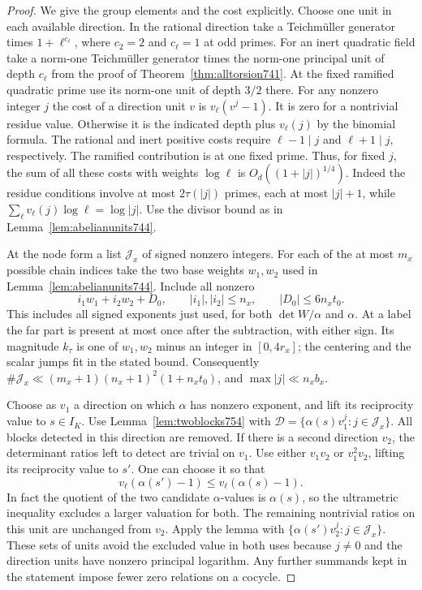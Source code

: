 \documentclass[a4paper,11pt]{article}
\theoremstyle{definition}
\theoremstyle{remark}
\numberwithin{equation}{section}
\begin{document}
\begin{proof}
We give the group elements and the cost explicitly. Choose
one unit in each available direction. In the rational direction
take a Teichm\"uller generator times \(1+\ell^{c_\ell}\),
where \(c_2=2\) and \(c_\ell=1\) at odd primes. For an inert
quadratic field take a norm-one Teichm\"uller generator times
the norm-one principal unit of depth \(c_\ell\) from the proof
of Theorem~\ref{thm:alltorsion741}. At the fixed ramified
quadratic prime use its norm-one unit of depth \(3/2\) there.
For any nonzero integer \(j\) the cost of a direction unit \(v\)
is \(v_\ell(v^j-1)\). It is zero for a nontrivial residue value.
Otherwise it is the indicated depth plus \(v_\ell(j)\) by
the binomial formula. The rational and inert positive costs
require \(\ell-1\mid j\) and \(\ell+1\mid j\), respectively.
The ramified contribution is at one fixed prime.
Thus, for fixed \(j\), the sum of all these costs with weights
\(\log\ell\) is \(O_d((1+|j|)^{1/4})\). Indeed the residue
conditions involve at most \(2\tau(|j|)\) primes, each at
most \(|j|+1\), while
\(\sum_\ell v_\ell(j)\log\ell=\log|j|\).
Use the divisor bound as in Lemma~\ref{lem:abelianunits744}.

At the node form a list \(\mathcal J_x\) of signed nonzero
integers. For each of the at most \(m_x\) possible chain
indices take the two base weights \(w_1,w_2\) used in
Lemma~\ref{lem:abelianunits744}. Include all nonzero
\[
         i_1w_1+i_2w_2+D_0,\qquad
     |i_1|,|i_2|\le n_x,\qquad |D_0|\le 6n_x t_0 .
\]
This includes all signed exponents just used, for both
\(\det W/\alpha\) and \(\alpha\). At a label the far part
is present at most once after the subtraction, with either
sign. Its magnitude \(k_\tau\) is one of \(w_1,w_2\) minus
an integer in \([0,4r_x]\); the centering and the scalar
jumps fit in the stated bound. Consequently
\(\#\mathcal J_x\ll(m_x+1)(n_x+1)^2(1+n_xt_0)\), and
\(\max|j|\ll n_xb_x\).

Choose as \(v_1\) a direction on which \(\alpha\) has nonzero
exponent, and lift its reciprocity value to \(s\in I_K\).
Use Lemma~\ref{lem:twoblocks754} with
\(\mathcal D=\{\alpha(s)v_1^j:j\in\mathcal J_x\}\).
All blocks detected in this direction are removed. If there
is a second direction \(v_2\), the determinant ratios left
to detect are trivial on \(v_1\). Use either
\(v_1v_2\) or \(v_1^2v_2\), lifting its reciprocity value to
\(s'\). One can choose it so that
\[
  v_\ell(\alpha(s')-1)\le v_\ell(\alpha(s)-1).
\]
In fact the quotient of the two candidate \(\alpha\)-values is
\(\alpha(s)\), so the ultrametric inequality excludes a larger
valuation for both. The remaining nontrivial ratios on this
unit are unchanged from \(v_2\). Apply the lemma with
\(\{\alpha(s')v_2^j:j\in\mathcal J_x\}\). These sets of units
avoid the excluded value in both uses because \(j\ne0\) and
the direction units have nonzero principal logarithm.
Any further summands kept in the statement impose fewer
zero relations on a cocycle.


\end{proof}
\end{document}
